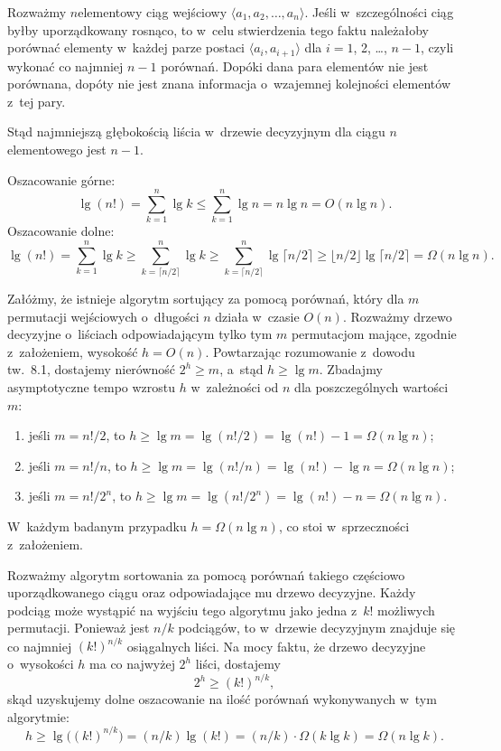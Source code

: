 
\exercise %
Rozważmy $n$\nbhyphen elementowy ciąg wejściowy $\langle a_1,a_2,\dots,a_n\rangle$.
Jeśli w~szczególności ciąg byłby uporządkowany rosnąco, to w~celu stwierdzenia tego faktu należałoby porównać elementy w~każdej parze postaci $\langle a_i,a_{i+1}\rangle$ dla $i=1$, 2, \dots, $n-1$, czyli wykonać co najmniej $n-1$ porównań.
Dopóki dana para elementów nie jest porównana, dopóty nie jest znana informacja o~wzajemnej kolejności elementów z~tej pary.

Stąd najmniejszą głębokością liścia w~drzewie decyzyjnym dla ciągu $n$\nbhyphen elementowego jest $n-1$.

\exercise %
Oszacowanie górne:
\[
	\lg(n!) = \sum_{k=1}^n\lg k \le \sum_{k=1}^n\lg n = n\lg n = O(n\lg n).
\]
Oszacowanie dolne:
\[
	\lg(n!) = \sum_{k=1}^n\lg k \ge \sum_{k=\lceil n/2\rceil}^n\lg k \ge \sum_{k=\lceil n/2\rceil}^n\lg\lceil n/2\rceil \ge \lfloor n/2\rfloor\lg\lceil n/2\rceil = \Omega(n\lg n).
\]

\exercise %
Załóżmy, że istnieje algorytm sortujący za pomocą porównań, który dla $m$ permutacji wejściowych o~długości $n$ działa w~czasie $O(n)$.
Rozważmy drzewo decyzyjne o~liściach odpowiadającym tylko tym $m$ permutacjom mające, zgodnie z~założeniem, wysokość $h=O(n)$.
Powtarzając rozumowanie z~dowodu tw.\ 8.1, dostajemy nierówność $2^h\ge m$, a~stąd $h\ge\lg m$.
Zbadajmy asymptotyczne tempo wzrostu $h$ w~zależności od $n$ dla poszczególnych wartości $m$:
\begin{enumerate}
	\renewcommand{\labelenumi}{(\roman{enumi})}
	\item jeśli $m=n!/2$, to $h\ge\lg m=\lg(n!/2)=\lg(n!)-1=\Omega(n\lg n)$;
	\item jeśli $m=n!/n$, to $h\ge\lg m=\lg(n!/n)=\lg(n!)-\lg n=\Omega(n\lg n)$;
	\item jeśli $m=n!/2^n$, to $h\ge\lg m=\lg(n!/2^n)=\lg(n!)-n=\Omega(n\lg n)$.
\end{enumerate}
W~każdym badanym przypadku $h=\Omega(n\lg n)$, co stoi w~sprzeczności z~założeniem.

\exercise %
Rozważmy algorytm sortowania za pomocą porównań takiego częściowo uporządkowanego ciągu oraz odpowiadające mu drzewo decyzyjne.
Każdy podciąg może wystąpić na wyjściu tego algorytmu jako jedna z~$k!$ możliwych permutacji.
Ponieważ jest $n/k$ podciągów, to w~drzewie decyzyjnym znajduje się co najmniej $(k!)^{n/k}$ osiągalnych liści.
Na mocy faktu, że drzewo decyzyjne o~wysokości $h$ ma co najwyżej $2^h$ liści, dostajemy
\[
	2^h \ge (k!)^{n/k},
\]
skąd uzyskujemy dolne oszacowanie na ilość porównań wykonywanych w~tym algorytmie:
\[
	h \ge \lg\bigl((k!)^{n/k}\bigr) = (n/k)\lg(k!) = (n/k)\cdot\Omega(k\lg k) = \Omega(n\lg k).
\]

